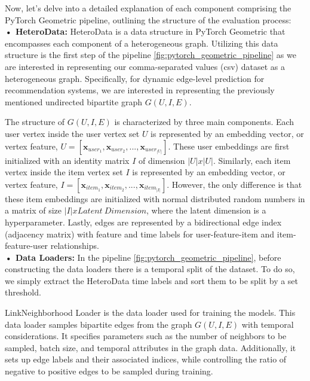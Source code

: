 \documentclass[bst/sn-nature]{sn-jnl}
\begin{document}
\begin{multicols}{2}
Now, let's delve into a detailed explanation of each component comprising the PyTorch Geometric pipeline, outlining the structure of the evaluation process: \\

\textbf{• HeteroData:} HeteroData is a data structure in PyTorch Geometric that encompasses each component of a heterogeneous graph. Utilizing this data structure is the first step of the pipeline \ref{fig:pytorch_geometric_pipeline} as we are interested in representing our comma-separated values (csv) dataset as a heterogeneous graph. Specifically, for dynamic edge-level prediction for recommendation systems, we are interested in representing the previously mentioned undirected bipartite graph $G(U,I,E)$. 

The structure of $G(U,I,E)$ is characterized by three main components. Each user vertex inside the user vertex set $U$ is represented by an embedding vector, or vertex feature, $U=[\mathbf{x}_{user_{1}},\mathbf{x}_{user_{2}}, ..., \mathbf{x}_{user_{|U|}}]$. These user embeddings are first initialized with an identity matrix $I$ of dimension $|U|x|U|$. Similarly, each item vertex inside the item vertex set $I$ is represented by an embedding vector, or vertex feature, $I=[\mathbf{x}_{item_{1}},\mathbf{x}_{item_{2}}, ..., \mathbf{x}_{item_{|I|}}]$. However, the only difference is that these item embeddings are initialized with normal distributed random numbers in a matrix of size $|I|xLatent \ Dimension$, where the latent dimension is a hyperparameter. Lastly, edges are represented by a bidirectional edge index (adjacency matrix) with feature and time labels for user-feature-item and item-feature-user relationships. \\

\textbf{• Data Loaders:} In the pipeline \ref{fig:pytorch_geometric_pipeline}, before constructing the data loaders there is a temporal split of the dataset. To do so, we simply extract the HeteroData time labels and sort them to be split by a set threshold.

LinkNeighborhood Loader is the data loader used for training the models. This data loader samples bipartite edges from the graph $G(U,I,E)$ with temporal considerations. It specifies parameters such as the number of neighbors to be sampled, batch size, and temporal attributes in the graph data. Additionally, it sets up edge labels and their associated indices, while controlling the ratio of negative to positive edges to be sampled during training. 


\end{multicols}
\end{document}
